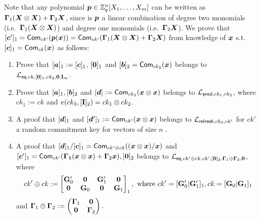 Note that any polynomial ${\boldsymbol{p}}\in\mathbb{Z}_q^n[X_1,\ldots,X_m]$ can be written as $\mathbf{{\Gamma}}_1({\boldsymbol{X}}\otimes{\boldsymbol{X}})+\mathbf{{\Gamma}}_2{\boldsymbol{X}}$, since is ${\boldsymbol{p}}$ a linear combination of degree two monomials (i.e.~$\mathbf{{\Gamma}}_1({\boldsymbol{X}}\otimes{\boldsymbol{X}})$) and degree one monomials (i.e.~$\mathbf{{\Gamma}}_2{\boldsymbol{X}}$).
We prove that $[{\boldsymbol{c}}']_1=\mathsf{Com}_{ck'}({\boldsymbol{p}}({\boldsymbol{x}}))=\mathsf{Com}_{ck'}(\mathbf{{\Gamma}}_1({\boldsymbol{X}}\otimes{\boldsymbol{X}})+\mathbf{{\Gamma}}_2{\boldsymbol{X}})$ from knowledge of ${\boldsymbol{x}}$ s.t. $[{\boldsymbol{c}}]_1 = \mathsf{Com}_{ck}({\boldsymbol{x}})$ as follows:
\begin{enumerate}
\item Prove that $[{\boldsymbol{a}}]_1:=[{\boldsymbol{c}}]_1$,  $[{\boldsymbol{0}}]_1$ and $[{\boldsymbol{b}}]_2=\mathsf{Com}_{ck_2}({\boldsymbol{x}})$ belongs to $\mathcal{L}_{\mathsf{eq},ck,[\mathbf{{0}}]_1,ck_2,\mathbf{{0}},\mathbf{{I}}_{m}}$.
\item Prove that $[{\boldsymbol{a}}]_1,[{\boldsymbol{b}}]_2$ and $[{\boldsymbol{d}}]:=\mathsf{Com}_{ck_3}({\boldsymbol{x}}\otimes{\boldsymbol{x}})$ belongs to $\mathcal{L}_{\mathsf{prod},ck_1,ck_2}$, where $ck_1:=ck$ and $e(ck_3,[\mathbf{{I}}]_2)=ck_1\otimes ck_2$.
\item A proof that $[{\boldsymbol{d}}]_1$ and $[{\boldsymbol{d}}']_1:=\mathsf{Com}_{ck'}({\boldsymbol{x}}\otimes{\boldsymbol{x}})$ belongs to $\mathcal{L}_{\mathsf{refresh},ck_3,ck'}$ for $ck'$ a random commitment key for vectors of size $n$ .
\item A proof that $[{\boldsymbol{d}}]_1/[{\boldsymbol{c}}]_1=\mathsf{Com}_{ck'\oplus ck}(({\boldsymbol{x}}\otimes{\boldsymbol{x}})/{\boldsymbol{x}})$ and $[{\boldsymbol{c}}']_1=\mathsf{Com}_{ck'}(\mathbf{{\Gamma_1}}({\boldsymbol{x}}\otimes{\boldsymbol{x}})+\mathbf{{\Gamma}}_2{\boldsymbol{x}}),[{\boldsymbol{0}}]_2$ belongs to $\mathcal{L}_{\mathsf{eq},ck'\oplus ck,ck',[\mathbf{{0}}]_2,\mathbf{{\Gamma}}_1\oplus\mathbf{{\Gamma}}_2,\mathbf{{0}}}$, where
$$
ck'\oplus ck := \left[\begin{matrix}
\mathbf{{G}}'_0 & \mathbf{{0}}      & \mathbf{{G}}'_1 &  \mathbf{{0}} \\
\mathbf{{0}}      & \mathbf{{G}}_0  & \mathbf{{0}}      & \mathbf{{G}}_1
\end{matrix}\right]_1,
\text{ where } ck'=[\mathbf{{G}}'_0|\mathbf{{G}}'_1]_1, ck=[\mathbf{{G}}_0|\mathbf{{G}}_1]_1
$$
and
$
\mathbf{{\Gamma}}_1\oplus\mathbf{{\Gamma}}_2 := \begin{pmatrix}
\mathbf{{\Gamma}}_1 & \mathbf{{0}}      \\
\mathbf{{0}}      & \mathbf{{\Gamma}}_2  
\end{pmatrix}.
$
\end{enumerate}

